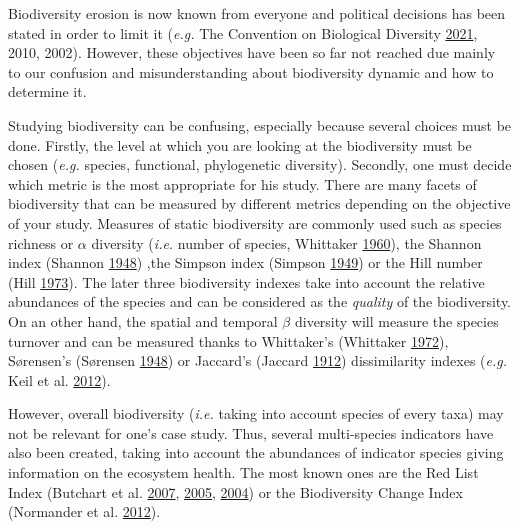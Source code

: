 \documentclass[
  12pt,
  oneside]{report}
\begin{document}
Biodiversity erosion is now known from everyone and political decisions has been stated in order to limit it (\emph{e.g.} The Convention on Biological Diversity \protect\hyperlink{ref-the_convention_on_biological_diversity_convention_2021}{2021}, 2010, 2002). However, these objectives have been so far not reached due mainly to our confusion and misunderstanding about biodiversity dynamic and how to determine it.

Studying biodiversity can be confusing, especially because several choices must be done. Firstly, the level at which you are looking at the biodiversity must be chosen (\emph{e.g.} species, functional, phylogenetic diversity). Secondly, one must decide which metric is the most appropriate for his study. There are many facets of biodiversity that can be measured by different metrics depending on the objective of your study. Measures of static biodiversity are commonly used such as species richness or \(\alpha\) diversity (\emph{i.e.} number of species, Whittaker \protect\hyperlink{ref-whittaker_vegetation_1960}{1960}), the Shannon index (Shannon \protect\hyperlink{ref-shannon_mathematical_1948}{1948}) ,the Simpson index (Simpson \protect\hyperlink{ref-simpson_measurement_1949}{1949}) or the Hill number (Hill \protect\hyperlink{ref-hill_diversity_1973}{1973}). The later three biodiversity indexes take into account the relative abundances of the species and can be considered as the \emph{quality} of the biodiversity. On an other hand, the spatial and temporal \(\beta\) diversity will measure the species turnover and can be measured thanks to Whittaker's (Whittaker \protect\hyperlink{ref-whittaker_evolution_1972}{1972}), Sørensen's (Sørensen \protect\hyperlink{ref-sorensen_method_1948}{1948}) or Jaccard's (Jaccard \protect\hyperlink{ref-jaccard_distribution_1912}{1912}) dissimilarity indexes (\emph{e.g.} Keil et al. \protect\hyperlink{ref-keil_patterns_2012}{2012}).

However, overall biodiversity (\emph{i.e.} taking into account species of every taxa) may not be relevant for one's case study. Thus, several multi-species indicators have also been created, taking into account the abundances of indicator species giving information on the ecosystem health. The most known ones are the Red List Index (Butchart et al. \protect\hyperlink{ref-butchart_improvements_2007}{2007}, \protect\hyperlink{ref-butchart_using_2005}{2005}, \protect\hyperlink{ref-butchart_measuring_2004}{2004}) or the Biodiversity Change Index (Normander et al. \protect\hyperlink{ref-normander_indicator_2012}{2012}).
\end{document}
